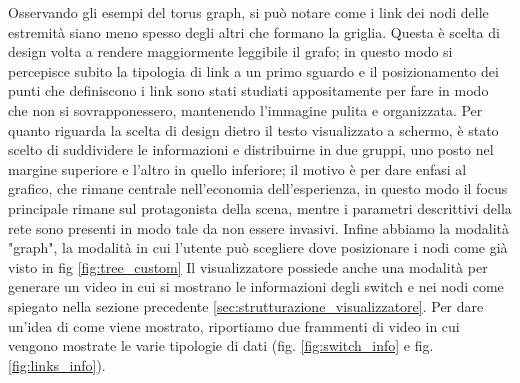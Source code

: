 \documentclass[binding=0.6cm]{sapthesis}
\begin{document}
Osservando gli esempi del torus graph, si può notare come i link dei nodi delle estremità siano meno spesso degli altri che formano la griglia.
Questa è scelta di design volta a rendere maggiormente leggibile il grafo; in questo modo si percepisce subito la tipologia di link a un primo sguardo e il
posizionamento dei punti che definiscono i link sono stati studiati appositamente per fare in modo che non si sovrapponessero, mantenendo l'immagine pulita e organizzata.
Per quanto riguarda la scelta di design dietro il testo visualizzato a schermo, è stato scelto di suddividere le informazioni e distribuirne in due gruppi, uno posto nel margine superiore e l'altro in quello inferiore;
il motivo è per dare enfasi al grafico, che rimane centrale nell'economia dell'esperienza, in questo modo il focus principale rimane sul protagonista della scena, mentre i parametri descrittivi della rete
sono presenti in modo tale da non essere invasivi.
Infine abbiamo la modalità "graph", la modalità in cui l'utente può scegliere dove posizionare i nodi come già visto in fig \ref{fig:tree_custom}
Il visualizzatore possiede anche una modalità per generare un video in cui si mostrano le informazioni degli switch 
e nei nodi come spiegato nella sezione precedente \ref{sec:strutturazione_visualizzatore}. Per dare un'idea di come viene mostrato, riportiamo due frammenti di video in cui vengono mostrate
le varie tipologie di dati (fig. \ref{fig:switch_info} e fig. \ref{fig:links_info}).
\newline
\newline
\end{document}
